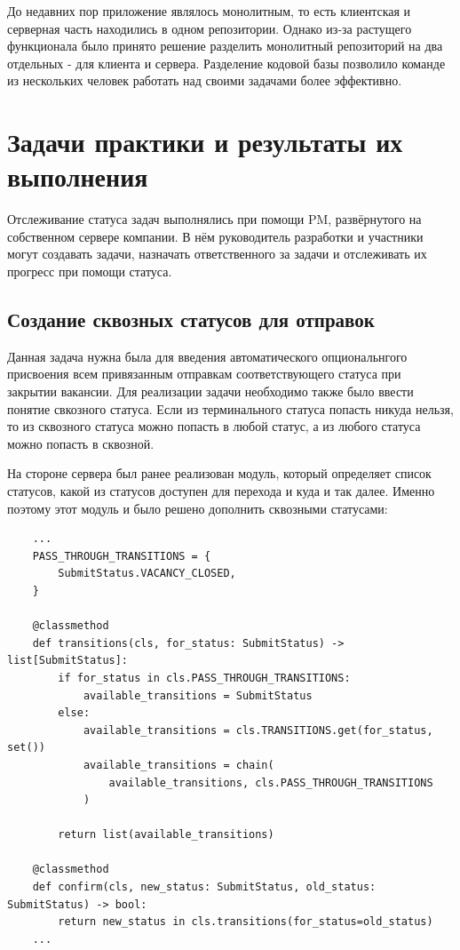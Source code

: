 \documentclass[a4paper,14pt]{extarticle}
\begin{document}
До недавних пор приложение являлось монолитным, то есть клиентская и серверная часть 
находились в одном репозитории. Однако из-за растущего функционала было принято решение
разделить монолитный репозиторий на два отдельных - для клиента и сервера. Разделение
кодовой базы позволило команде из нескольких человек работать над своими задачами более
эффективно.
\section{Задачи практики и результаты их выполнения}
Отслеживание статуса задач выполнялись при помощи PM, развёрнутого на собственном 
сервере компании. В нём руководитель разработки и участники могут создавать задачи, 
назначать ответственного за задачи и отслеживать их прогресс при помощи статуса.
\subsection{Создание сквозных статусов для отправок}
Данная задача нужна была для введения автоматического опциональнгого присвоения всем привязанным 
отправкам соответствующего статуса при закрытии вакансии. Для реализации задачи необходимо также
было ввести понятие свкозного статуса. Если из терминального статуса попасть никуда нельзя, 
то из сквозного статуса можно попасть в любой статус, а из любого статуса можно попасть в 
сквозной. 

На стороне сервера был ранее реализован модуль, который определяет список статусов, какой из статусов 
доступен для перехода и куда и так далее. Именно поэтому этот модуль и было решено дополнить 
сквозными статусами:
\begin{verbatim}
    ...
    PASS_THROUGH_TRANSITIONS = {
        SubmitStatus.VACANCY_CLOSED,
    }

    @classmethod
    def transitions(cls, for_status: SubmitStatus) -> list[SubmitStatus]:
        if for_status in cls.PASS_THROUGH_TRANSITIONS:
            available_transitions = SubmitStatus
        else:
            available_transitions = cls.TRANSITIONS.get(for_status, set())
            available_transitions = chain(
                available_transitions, cls.PASS_THROUGH_TRANSITIONS
            )

        return list(available_transitions)

    @classmethod
    def confirm(cls, new_status: SubmitStatus, old_status: SubmitStatus) -> bool:
        return new_status in cls.transitions(for_status=old_status)
    ...
\end{verbatim}
\end{document}

